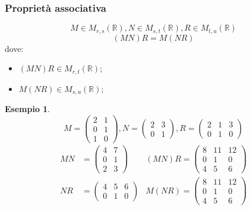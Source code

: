\documentclass[a4paper]{article}
\theoremstyle{definition}
\newtheorem*{es}{Esempio}
\begin{document}
\subsubsection{Proprietà associativa}
\[ M \in M_{r, s}(\mathbb{R}), N \in M_{s, t}(\mathbb{R}), R \in M_{t, u}(\mathbb{R}) \]
\[ (MN)R = M(NR) \]
dove:
\begin{itemize}
	\item $(MN)R \in M_{r, t}(\mathbb{R})$;
	\item $M(NR) \in M_{s, u}(\mathbb{R})$;
\end{itemize}
\begin{es}
	\[ M = \begin{pmatrix}
		2 & 1 \\
		0 & 1 \\
		1 & 0
	\end{pmatrix}, N = \begin{pmatrix}
		2 & 3 \\
		0 & 1
	\end{pmatrix}, R = \begin{pmatrix}
		2 & 1 & 3 \\
		0 & 1 & 0
	\end{pmatrix} \]
	\begin{align*}
		MN &= \begin{pmatrix}
			4 & 7 \\
			0 & 1 \\
			2 & 3
		\end{pmatrix}
		& (MN)R = \begin{pmatrix}
			8   & 11   & 12   \\
			0   & 1    & 0    \\
			4   & 5    & 6
		\end{pmatrix} \\
		NR &= \begin{pmatrix}
			4 & 5 & 6 \\
			0 & 1 & 0
		\end{pmatrix}
		& M(NR) = \begin{pmatrix}
			8   & 11   & 12   \\
			0   & 1    & 0    \\
			4   & 5    & 6
		\end{pmatrix}
	\end{align*}
\end{es}
\end{document}
